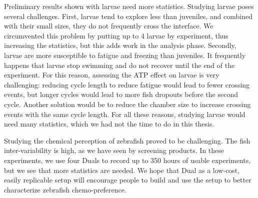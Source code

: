   Preliminary results shown with larvae need more statistics. Studying larvae poses several challenges. First, larvae tend to explore less than juveniles, and combined with their small sizes, they do not frequently cross the interface. We circumvented this problem by putting up to 4 larvae by experiment, thus increasing the statistics, but this adds work in the analysis phase. Secondly, larvae are more susceptible to fatigue and freezing than juveniles. It frequently happens that larvae stop swimming and do not recover until the end of the experiment.
For this reason, assessing the ATP effect on larvae is very challenging: reducing cycle length to reduce fatigue would lead to fewer crossing events, but longer cycles would lead to more fish dropouts before the second cycle. Another solution would be to reduce the chamber size to increase crossing events with the same cycle length. For all these reasons, studying larvae would need many statistics, which we had not the time to do in this thesis.

  Studying the chemical perception of zebrafish proved to be challenging. The fish inter-variability is high, as we have seen by screening products. In these experiments, we use four Duals to record up to 350 hours of usable experiments, but we see that more statistics are needed. We hope that Dual as a low-cost, easily replicable setup will encourage people to build and use the setup to better characterize zebrafish chemo-preference.


